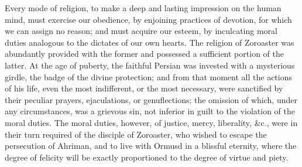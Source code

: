 Every mode of religion, to make a deep and lasting impression on
the human mind, must exercise our obedience, by enjoining
practices of devotion, for which we can assign no reason; and
must acquire our esteem, by inculcating moral duties analogous to
the dictates of our own hearts. The religion of Zoroaster was
abundantly provided with the former and possessed a sufficient
portion of the latter. At the age of puberty, the faithful
Persian was invested with a mysterious girdle, the badge of the
divine protection; and from that moment all the actions of his
life, even the most indifferent, or the most necessary, were
sanctified by their peculiar prayers, ejaculations, or
genuflections; the omission of which, under any circumstances,
was a grievous sin, not inferior in guilt to the violation of the
moral duties. The moral duties, however, of justice, mercy,
liberality, \&c., were in their turn required of the disciple of
Zoroaster, who wished to escape the persecution of Ahriman, and
to live with Ormusd in a blissful eternity, where the degree of
felicity will be exactly proportioned to the degree of virtue and
piety.\footnotemark[14]


